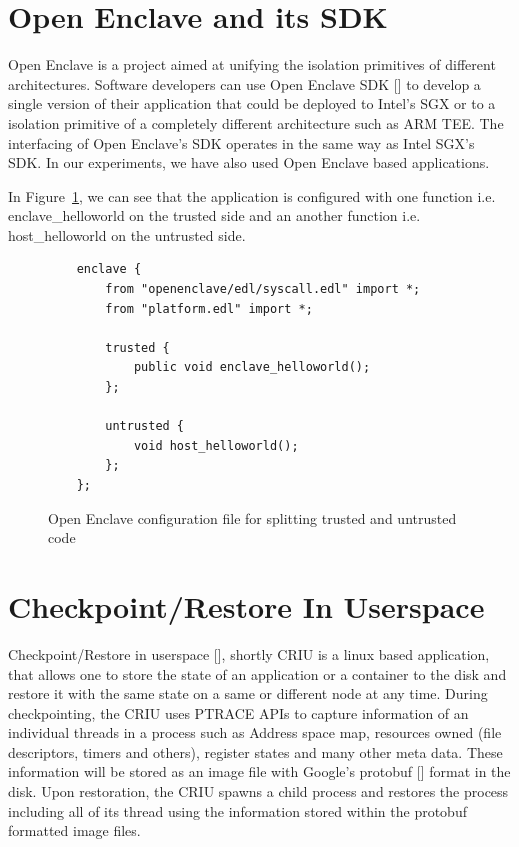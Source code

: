 \documentclass[article, doublespace,nopageskip]{VTthesis} %
\begin{document}
    \section{Open Enclave and its SDK} \label{ss:Openenclave SGX SDK}
    Open Enclave is a project aimed at unifying the isolation primitives of different architectures. Software developers can use Open Enclave SDK [] to develop a single version of their application that could be deployed to Intel's SGX or to a isolation primitive of a completely different architecture such as ARM TEE. The interfacing of Open Enclave's SDK operates in the same way as Intel SGX's SDK. In our experiments, we have also used Open Enclave based applications.

    In Figure~\ref{fig:OE config}, we can see that the application is configured with one function i.e. enclave\_helloworld on the trusted side and an another function i.e. host\_helloworld on the untrusted side. 

    \begin{figure}
    \begin{tcolorbox}
    \begin{verbatim}
    enclave {
        from "openenclave/edl/syscall.edl" import *;
        from "platform.edl" import *;

        trusted {
            public void enclave_helloworld();
        };

        untrusted {
            void host_helloworld();
        };
    };
    \end{verbatim}
    \end{tcolorbox}
    \caption{Open Enclave configuration file for splitting trusted and untrusted code}
    \label{fig:OE config}
    \end{figure}

    \section{Checkpoint/Restore In Userspace} \label{ss:CRIU}
    Checkpoint/Restore in userspace [], shortly CRIU is a linux based application, that allows one to store the state of an application or a container to the disk and restore it with the same state on a same or different node at any time. During checkpointing, the CRIU uses PTRACE APIs to capture information of an individual threads in a process such as Address space map, resources owned (file descriptors, timers and others), register states and many other meta data. These information will be stored as an image file with Google's protobuf [] format in the disk. Upon restoration, the CRIU spawns a child process and restores the process including all of its thread using the information stored within the protobuf formatted image files. 
\end{document}
